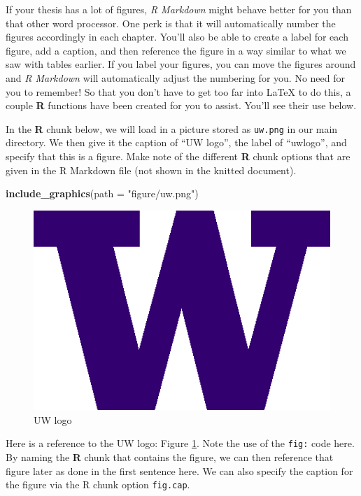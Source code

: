 \documentclass [11pt, proquest] {uwthesis}[2015/03/03]
\newenvironment{Shaded}{}{}
\newcommand{\KeywordTok}[1]{\textcolor[rgb]{0.00,0.44,0.13}{\textbf{{#1}}}}
\newcommand{\DataTypeTok}[1]{\textcolor[rgb]{0.56,0.13,0.00}{{#1}}}
\newcommand{\StringTok}[1]{\textcolor[rgb]{0.25,0.44,0.63}{{#1}}}
\newcommand{\NormalTok}[1]{{#1}}
\begin{document}
If your thesis has a lot of figures, \emph{R Markdown} might behave
better for you than that other word processor. One perk is that it will
automatically number the figures accordingly in each chapter. You'll
also be able to create a label for each figure, add a caption, and then
reference the figure in a way similar to what we saw with tables
earlier. If you label your figures, you can move the figures around and
\emph{R Markdown} will automatically adjust the numbering for you. No
need for you to remember! So that you don't have to get too far into
LaTeX to do this, a couple \textbf{R} functions have been created for
you to assist. You'll see their use below.

In the \textbf{R} chunk below, we will load in a picture stored as
\texttt{uw.png} in our main directory. We then give it the caption of
``UW logo'', the label of ``uwlogo'', and specify that this is a figure.
Make note of the different \textbf{R} chunk options that are given in
the R Markdown file (not shown in the knitted document).
\begin{Shaded}
\begin{Highlighting}[]
\KeywordTok{include_graphics}\NormalTok{(}\DataTypeTok{path =} \StringTok{"figure/uw.png"}\NormalTok{)}
\end{Highlighting}
\end{Shaded}
\begin{figure}
\centering
\includegraphics{figure/uw.png}
\caption{\label{fig:uwlogo}UW logo}
\end{figure}
Here is a reference to the UW logo: Figure \ref{fig:uwlogo}. Note the
use of the \texttt{fig:} code here. By naming the \textbf{R} chunk that
contains the figure, we can then reference that figure later as done in
the first sentence here. We can also specify the caption for the figure
via the R chunk option \texttt{fig.cap}.
\end{document}
